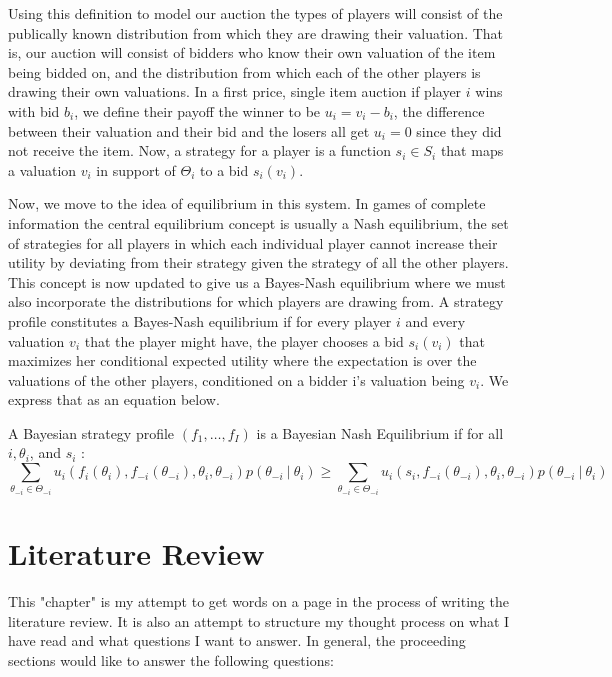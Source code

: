 \documentclass[12pt,twoside]{reedthesis}
\begin{document}
Using this definition to model our auction the types of players will consist of the publically known distribution from which they are drawing their valuation. That is, our auction will consist of bidders who know their own valuation of the item being bidded on, and the distribution from which each of the other players is drawing their own valuations. In a first price, single item auction if player $i$ wins with bid $b_i$, we define their payoff the winner to be $u_i = v_i - b_i$, the difference between their valuation and their bid and the losers all get $u_i = 0$ since they did not receive the item. Now, a strategy for a player is a function $s_i \in S_i$ that maps a valuation $v_i$ in support of $\Theta_i$ to a bid $s_i(v_i)$. 

Now, we move to the idea of equilibrium in this system. In games of complete information the central equilibrium concept is usually a Nash equilibrium, the set of strategies for all players in which each individual player cannot increase their utility by deviating from their strategy given the strategy of all the other players. This concept is now updated to give us a Bayes-Nash equilibrium where we must also incorporate the distributions for which players are drawing from. A strategy profile constitutes a Bayes-Nash equilibrium if for every player $i$ and every valuation $v_i$ that the player might have, the player chooses a bid $s_i(v_i)$ that maximizes her conditional expected utility where the expectation is over the valuations of the other players, conditioned on a bidder i's valuation being $v_i$. We express that as an equation below.

\begin{dfn}
	A Bayesian strategy profile $(f_1, \ldots, f_I)$ is a Bayesian Nash Equilibrium if for all $i, \theta_i$, and $s_i$ :
	$$ \sum_{\theta_{-i} \in \Theta_{-i}} u_i(f_i(\theta_i), f_{-i}(\theta_{-i}), \theta_i, \theta_{-i})p(\theta_{-i} \ | \ \theta_i) \geq \sum_{\theta_{-i} \in \Theta_{-i}} u_i(s_i, f_{-i}(\theta_{-i}), \theta_i, \theta_{-i})p(\theta_{-i} \ | \ \theta_i)$$
\end{dfn}

 
\chapter{Literature Review}
	This "chapter" is my attempt to get words on a page in the process of writing the literature review. It is also an attempt to structure my thought process on what I have read and what questions I want to answer. In general, the proceeding sections would like to answer the following questions:
	
\end{document}
